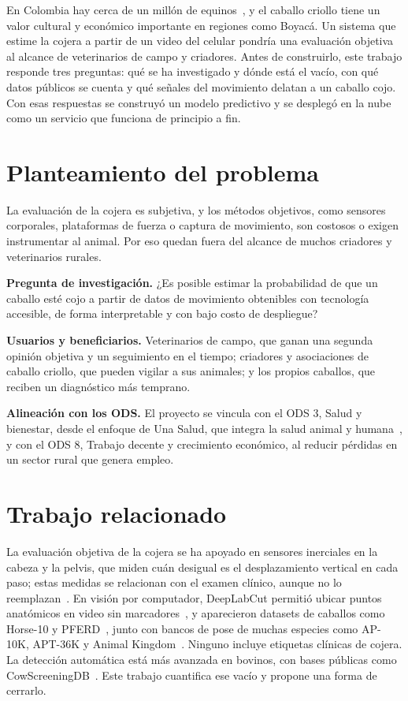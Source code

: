 \documentclass[conference,a4paper]{IEEEtran}
\begin{document}
En Colombia hay cerca de un millón de equinos~\cite{agronegocios2025censo}, y el caballo criollo tiene un valor cultural y económico importante en regiones como Boyacá. Un sistema que estime la cojera a partir de un video del celular pondría una evaluación objetiva al alcance de veterinarios de campo y criadores. Antes de construirlo, este trabajo responde tres preguntas: qué se ha investigado y dónde está el vacío, con qué datos públicos se cuenta y qué señales del movimiento delatan a un caballo cojo. Con esas respuestas se construyó un modelo predictivo y se desplegó en la nube como un servicio que funciona de principio a fin.

\section{Planteamiento del problema}
La evaluación de la cojera es subjetiva, y los métodos objetivos, como sensores corporales, plataformas de fuerza o captura de movimiento, son costosos o exigen instrumentar al animal. Por eso quedan fuera del alcance de muchos criadores y veterinarios rurales.

\textbf{Pregunta de investigación.} ¿Es posible estimar la probabilidad de que un caballo esté cojo a partir de datos de movimiento obtenibles con tecnología accesible, de forma interpretable y con bajo costo de despliegue?

\textbf{Usuarios y beneficiarios.} Veterinarios de campo, que ganan una segunda opinión objetiva y un seguimiento en el tiempo; criadores y asociaciones de caballo criollo, que pueden vigilar a sus animales; y los propios caballos, que reciben un diagnóstico más temprano.

\textbf{Alineación con los ODS.} El proyecto se vincula con el ODS 3, Salud y bienestar, desde el enfoque de Una Salud, que integra la salud animal y humana~\cite{un2015}, y con el ODS 8, Trabajo decente y crecimiento económico, al reducir pérdidas en un sector rural que genera empleo.

\section{Trabajo relacionado}
La evaluación objetiva de la cojera se ha apoyado en sensores inerciales en la cabeza y la pelvis, que miden cuán desigual es el desplazamiento vertical en cada paso; estas medidas se relacionan con el examen clínico, aunque no lo reemplazan~\cite{keegan2013}. En visión por computador, DeepLabCut permitió ubicar puntos anatómicos en video sin marcadores~\cite{mathis2018}, y aparecieron datasets de caballos como Horse-10 y PFERD~\cite{mathis2021,li2024pferd}, junto con bancos de pose de muchas especies como AP-10K, APT-36K y Animal Kingdom~\cite{yu2021ap10k,yang2022apt36k,ng2022animalkingdom}. Ninguno incluye etiquetas clínicas de cojera. La detección automática está más avanzada en bovinos, con bases públicas como CowScreeningDB~\cite{ismail2024cow}. Este trabajo cuantifica ese vacío y propone una forma de cerrarlo.
\end{document}
